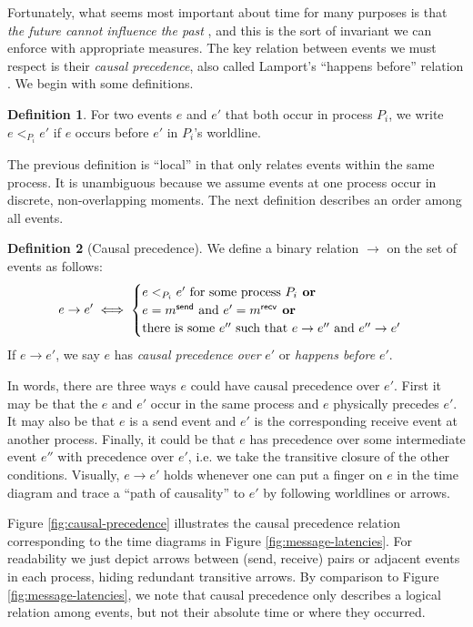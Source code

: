 \documentclass[]             %
{NASA}                       %
\theoremstyle{definition}
\newtheorem{definition}{Definition}[section]
\begin{document}
Fortunately, what seems most important about time for many purposes is
that \emph{the future cannot influence the past} \cite{1989mattern}, and
this is the sort of invariant we can enforce with appropriate
measures. The key relation between events we must respect is their
\emph{causal precedence}, also called Lamport's ``happens before''
relation \cite{1978:lamportclocks}. We begin with some definitions.

\begin{definition}
  For two events $e$ and $e'$ that both occur in process $P_i$, we
  write $e <_{P_i} e'$ if $e$ occurs before $e'$ in $P_i$'s
  worldline.
\end{definition}
The previous definition is ``local'' in that only relates events
within the same process. It is unambiguous because we assume events at
one process occur in discrete, non-overlapping moments. The next
definition describes an order among all events.

\begin{definition}[Causal precedence]
  \label{def:causalprecedence}
  We define a binary relation $\to$ on the set of events as follows:
  \[e \to e' \iff
  \begin{cases}
    e <_{P_i} e' \textrm{ for some process $P_i$}
    \textbf{ or} \\
    e = m_{}^{\mathsf{send}} \textrm{ and } e' =m_{}^{\mathsf{recv}}
    \textbf{ or} \\
    \textrm{there is some } e'' \textrm{ such that } e \to e'' \textrm{ and } e'' \to e'
  \end{cases}
  \]
  If $e \to e'$, we say $e$ has \emph{causal precedence over} $e'$ or
  \emph{happens before} $e'$.
\end{definition}

In words, there are three ways $e$ could have causal precedence over
$e'$.  First it may be that the $e$ and $e'$ occur in the same process
and $e$ physically precedes $e'$. It may also be that $e$ is a
send event and $e'$ is the corresponding receive event at another
process. Finally, it could be that $e$ has precedence over some
intermediate event $e''$ with precedence over $e'$, i.e. we take
the transitive closure of the other conditions. Visually, $e \to e'$
holds whenever one can put a finger on $e$ in the time diagram and
trace a ``path of causality'' to $e'$ by following worldlines or
arrows.

Figure \ref{fig:causal-precedence} illustrates the causal precedence
relation corresponding to the time diagrams in Figure
\ref{fig:message-latencies}. For readability we just depict arrows
between (send, receive) pairs or adjacent events in each process,
hiding redundant transitive arrows. By comparison to Figure
\ref{fig:message-latencies}, we note that causal precedence only
describes a logical relation among events, but not their absolute time
or where they occurred.
\end{document}
